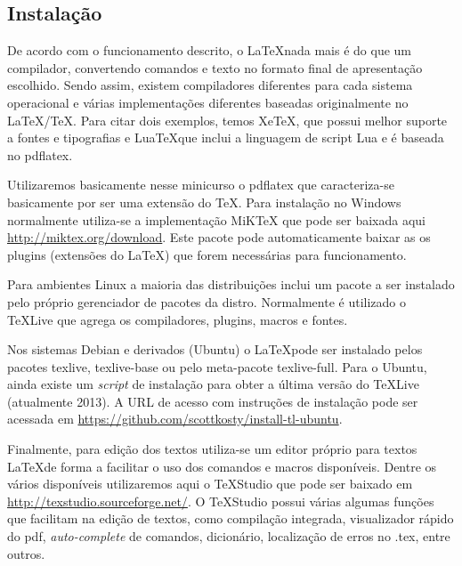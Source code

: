\subsection{Instalação}
De acordo com o funcionamento descrito, o \LaTeX nada mais é do que um compilador, convertendo comandos e texto no formato final de apresentação escolhido. Sendo assim, existem compiladores diferentes para cada sistema operacional e várias implementações diferentes baseadas originalmente no \LaTeX/\TeX. Para citar dois exemplos, temos Xe\TeX\cite{xetex}, que possui melhor suporte a fontes e tipografias e 
Lua\TeX que inclui a linguagem de script Lua e é baseada no \textsf{pdflatex}.

Utilizaremos basicamente nesse minicurso o \textsf{pdflatex} que caracteriza-se basicamente por ser uma extensão do \TeX. Para instalação no Windows normalmente utiliza-se a implementação MiK\TeX\cite{miktex} que pode ser baixada aqui \url{http://miktex.org/download}. Este pacote pode automaticamente baixar as os plugins (extensões do \LaTeX) que forem necessárias para funcionamento.

Para ambientes Linux a maioria das distribuições inclui um pacote a ser instalado pelo próprio gerenciador de pacotes da distro. Normalmente é utilizado o \TeX Live que agrega os compiladores, plugins, macros e fontes.

Nos sistemas Debian e derivados (Ubuntu) o \LaTeX pode ser instalado pelos pacotes \textsf{texlive}, \textsf{texlive-base} ou pelo meta-pacote \textsf{texlive-full}. Para o Ubuntu, ainda existe um \textit{script} de instalação\cite{intall-tl-ubuntu} para obter a última versão do \TeX Live (atualmente 2013). A URL de acesso com instruções de instalação pode ser acessada em \url{https://github.com/scottkosty/install-tl-ubuntu}.

Finalmente, para edição dos textos utiliza-se um editor próprio para textos \LaTeX de forma a facilitar o uso dos comandos e macros disponíveis. Dentre os vários disponíveis\cite{wiki:texEditors} utilizaremos aqui o TeXStudio\cite{texstudio} que pode ser baixado em \url{http://texstudio.sourceforge.net/}. O TeXStudio possui várias algumas funções que facilitam na edição de textos, como compilação integrada, visualizador rápido do pdf, \textit{auto-complete} de comandos, dicionário, localização de erros no \textsf{.tex}, entre outros.